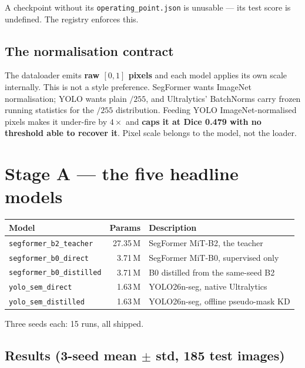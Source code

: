 \documentclass[11pt]{article}
\begin{document}
A checkpoint without its \texttt{operating\_point.json} is unusable --- its test
score is undefined. The registry enforces this.

\subsection{The normalisation contract}

The dataloader emits \textbf{raw $[0,1]$ pixels} and each model applies its own
scale internally. This is not a style preference. SegFormer wants ImageNet
normalisation; YOLO wants plain $/255$, and Ultralytics' BatchNorms carry frozen
running statistics for the $/255$ distribution. Feeding YOLO ImageNet-normalised
pixels makes it under-fire by $4\times$ and \textbf{caps it at Dice 0.479 with no
threshold able to recover it}. Pixel scale belongs to the model, not the loader.

\section{Stage A --- the five headline models}
\label{sec:stagea}

\begin{center}
\begin{tabular}{LnW}
\toprule
\textbf{Model} & \textbf{Params} & \textbf{Description} \\
\midrule
\texttt{segformer\_b2\_teacher} & 27.35\,M & SegFormer MiT-B2, the teacher \\
\texttt{segformer\_b0\_direct} & 3.71\,M & SegFormer MiT-B0, supervised only \\
\texttt{segformer\_b0\_distilled} & 3.71\,M & B0 distilled from the same-seed B2 \\
\texttt{yolo\_sem\_direct} & 1.63\,M & YOLO26n-seg, native Ultralytics \\
\texttt{yolo\_sem\_distilled} & 1.63\,M & YOLO26n-seg, offline pseudo-mask KD \\
\bottomrule
\end{tabular}
\end{center}

Three seeds each: 15 runs, all shipped.

\subsection{Results (3-seed mean $\pm$ std, 185 test images)}
\end{document}
